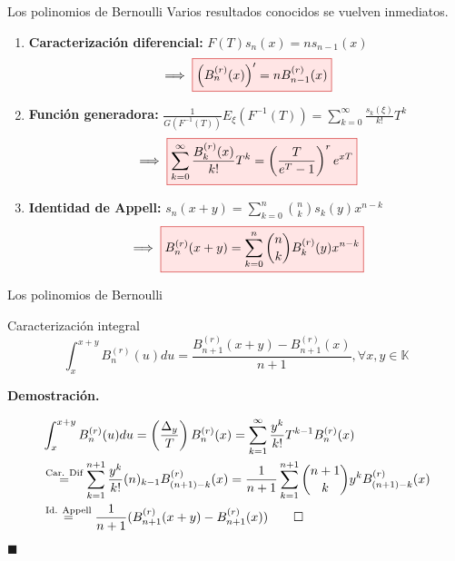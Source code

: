 \documentclass{beamer}
\newenvironment{demo}{%
  \par\medskip\noindent\textbf{Demostración.}\hspace{0.5em}%
}{%
  \hfill$\blacksquare$\par\medskip%
}
\newcommand{\rboxed}[1]{%
  \fcolorbox{red!80!black}{red!10}{$#1$}%
}
\newcommand{\field}{\mathbb{K}} %
\begin{document}
\begin{frame}{Los polinomios de Bernoulli}
  Varios resultados conocidos se vuelven inmediatos.
  \begin{enumerate}
    \item \textbf{Caracterización diferencial:} $F(T)s_{n}(x) = ns_{n-1}(x)$ \begin{equation*}
      \implies \rboxed{\left(B_n^{(r)}(x)\right)' = n B_{n-1}^{(r)}(x)}
    \end{equation*}
    \item \textbf{Función generadora:} $\frac{1}{G(F^{-1}(T))}E_{\xi} (F^{-1}(T)) = \sum_{k=0}^\infty \frac{s_k(\xi)}{k!}T^k$ \begin{equation*}
      \implies \rboxed{\displaystyle \sum_{k=0}^\infty \frac{B_k^{(r)}(x)}{k!} T^k = \left(\frac{T}{e^T - 1}\right)^r e^{x T}}
    \end{equation*}
    \item \textbf{Identidad de Appell:} $s_n (x+y) = \sum_{k=0}^n \binom{n}{k} s_k (y) x^{n-k}$ \begin{equation*}
      \implies \rboxed{\displaystyle B_n^{(r)}(x + y) = \sum_{k=0}^n \binom{n}{k} B_k^{(r)}(y)x^{n-k}}
    \end{equation*}
  \end{enumerate}
\end{frame}

\begin{frame}{Los polinomios de Bernoulli}
  \begin{block}{Caracterización integral}
    \begin{equation*}
        \int_{x}^{x + y} B_n^{(r)}(u) du = \frac{B_{n+1}^{(r)}(x + y) - B_{n+1}^{(r)}(x)}{n+1}, \forall x, y \in \field
    \end{equation*}
  \end{block}

  \begin{demo}
    \begin{align*}
        & \int_{x}^{x + y} B_n^{(r)}(u) du = \left(\frac{\Delta_y}{T}\right) B_n^{(r)}(x) = \sum_{k=1}^{\infty} \frac{y^k}{k!} T^{k-1}B_{n}^{(r)}(x)\\ 
        & \stackrel{\scriptsize{\text{Car. Dif}}}{=} \sum_{k=1}^{n+1} \frac{y^k}{k!} (n)_{k-1}B_{(n+1) - k}^{(r)}(x) = \frac{1}{n+1} \sum_{k=1}^{n+1} \binom{n+1}{k} y^k B_{(n+1) - k}^{(r)}(x)\\
        & \stackrel{\scriptsize \text{Id. Appell}}{=} \frac{1}{n+1} (B_{n+1}^{(r)}(x + y) - B_{n+1}^{(r)}(x)) \qedhere
    \end{align*}
  \end{demo}
\end{frame}
\end{document}
